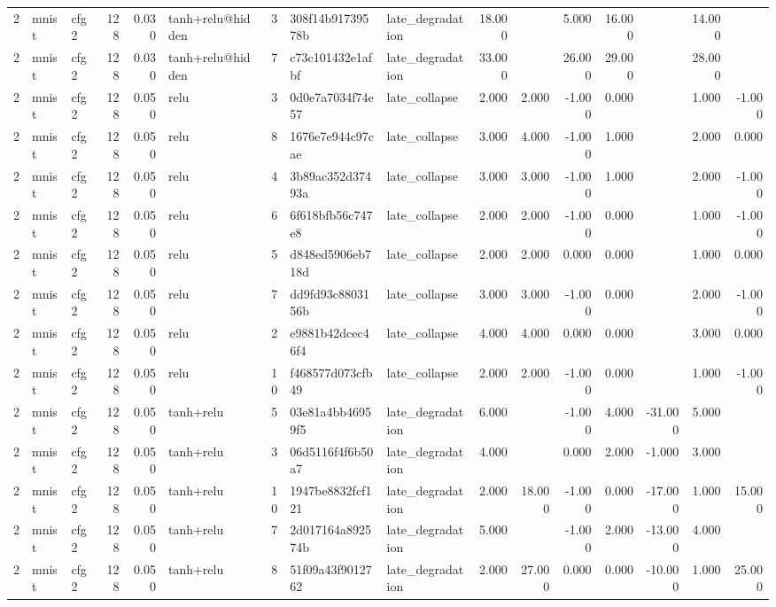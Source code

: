 \begin{table}[htbp]
{\begin{tabular}{@{}rllrrlrllrrrrrrr@{}}
2 & mnist & cfg2 & 128 & 0.030 & tanh+relu@hidden & 3 & 308f14b91739578b & late\_degradation & 18.000 &  & 5.000 & 16.000 &  & 14.000 &  \\
2 & mnist & cfg2 & 128 & 0.030 & tanh+relu@hidden & 7 & c73c101432e1afbf & late\_degradation & 33.000 &  & 26.000 & 29.000 &  & 28.000 &  \\
2 & mnist & cfg2 & 128 & 0.050 & relu & 3 & 0d0e7a7034f74e57 & late\_collapse & 2.000 & 2.000 & -1.000 & 0.000 &  & 1.000 & -1.000 \\
2 & mnist & cfg2 & 128 & 0.050 & relu & 8 & 1676e7e944c97cae & late\_collapse & 3.000 & 4.000 & -1.000 & 1.000 &  & 2.000 & 0.000 \\
2 & mnist & cfg2 & 128 & 0.050 & relu & 4 & 3b89ac352d37493a & late\_collapse & 3.000 & 3.000 & -1.000 & 1.000 &  & 2.000 & -1.000 \\
2 & mnist & cfg2 & 128 & 0.050 & relu & 6 & 6f618bfb56c747e8 & late\_collapse & 2.000 & 2.000 & -1.000 & 0.000 &  & 1.000 & -1.000 \\
2 & mnist & cfg2 & 128 & 0.050 & relu & 5 & d848ed5906eb718d & late\_collapse & 2.000 & 2.000 & 0.000 & 0.000 &  & 1.000 & 0.000 \\
2 & mnist & cfg2 & 128 & 0.050 & relu & 7 & dd9fd93c8803156b & late\_collapse & 3.000 & 3.000 & -1.000 & 0.000 &  & 2.000 & -1.000 \\
2 & mnist & cfg2 & 128 & 0.050 & relu & 2 & e9881b42dcec46f4 & late\_collapse & 4.000 & 4.000 & 0.000 & 0.000 &  & 3.000 & 0.000 \\
2 & mnist & cfg2 & 128 & 0.050 & relu & 10 & f468577d073cfb49 & late\_collapse & 2.000 & 2.000 & -1.000 & 0.000 &  & 1.000 & -1.000 \\
2 & mnist & cfg2 & 128 & 0.050 & tanh+relu & 5 & 03e81a4bb46959f5 & late\_degradation & 6.000 &  & -1.000 & 4.000 & -31.000 & 5.000 &  \\
2 & mnist & cfg2 & 128 & 0.050 & tanh+relu & 3 & 06d5116f4f6b50a7 & late\_degradation & 4.000 &  & 0.000 & 2.000 & -1.000 & 3.000 &  \\
2 & mnist & cfg2 & 128 & 0.050 & tanh+relu & 10 & 1947be8832fcf121 & late\_degradation & 2.000 & 18.000 & -1.000 & 0.000 & -17.000 & 1.000 & 15.000 \\
2 & mnist & cfg2 & 128 & 0.050 & tanh+relu & 7 & 2d017164a892574b & late\_degradation & 5.000 &  & -1.000 & 2.000 & -13.000 & 4.000 &  \\
2 & mnist & cfg2 & 128 & 0.050 & tanh+relu & 8 & 51f09a43f9012762 & late\_degradation & 2.000 & 27.000 & 0.000 & 0.000 & -10.000 & 1.000 & 25.000 \\

\end{tabular}}
\end{table}
